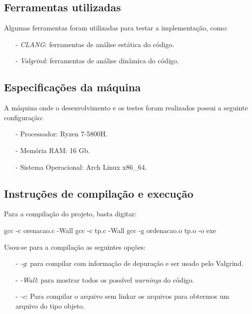 \documentclass{article}
\begin{document}
\subsection{Ferramentas utilizadas}
Algumas ferramentas foram utilizadas para testar a implementação, como:

\begin{itemize}
    \item[-] \textit{CLANG}: ferramentas de análise estática do código.
    \item[-] \textit{Valgrind}: ferramentas de análise dinâmica do código.
\end{itemize}

\subsection{Especificações da máquina}
A máquina onde o desenvolvimento e os testes foram realizados possui a seguinte configuração:

\begin{itemize}
    \item[-] Processador: Ryzen 7-5800H.
    \item[-] Memória RAM: 16 Gb.
    \item[-] Sistema Operacional: Arch Linux x86\_64.
\end{itemize}


\subsection{Instruções de compilação e execução}

Para a compilação do projeto, basta digitar:

\begin{tcolorbox}[title=Compilando o projeto,width=\linewidth]
    gcc -c orenacao.c -Wall \newline
    gcc -c tp.c -Wall \newline
    gcc  -g ordenacao.o tp.o -o exe
\end{tcolorbox}

Usou-se para a compilação as seguintes opções:

\begin{itemize}
    \item [-] \emph{-g}: para compilar com informação de depuração e ser usado pelo Valgrind.
    \item [-] \emph{-Wall}: para mostrar todos os possível \emph{warnings} do código.
    \item [-] \emph{-c}: Para compilar o arquivo sem linkar os arquivos para obtermos um arquivo do tipo objeto.
\end{itemize}
\end{document}
